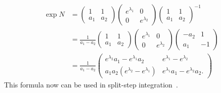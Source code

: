 \begin{equation}
\begin{split}
	\exp \hat{N} & = \begin{pmatrix}
		1 & 1 \\ a_1 & a_2
	\end{pmatrix}
	\begin{pmatrix}
		e^{\lambda_1} & 0 \\ 0 & e^{\lambda_2}
	\end{pmatrix}
	\begin{pmatrix}
		1 & 1 \\ a_1 & a_2
	\end{pmatrix}^{-1} \\
	& = \frac{1}{a_1 - a_2}
	\begin{pmatrix}
		1 & 1 \\ a_1 & a_2
	\end{pmatrix}
	\begin{pmatrix}
		e^{\lambda_1} & 0 \\ 0 & e^{\lambda_2}
	\end{pmatrix}
	\begin{pmatrix}
		-a_2 & 1 \\ a_1 & -1
	\end{pmatrix} \\
	& = \frac{1}{a_1 - a_2}
	\begin{pmatrix}
		e^{\lambda_2} a_1 - e^{\lambda_1} a_2 &
		e^{\lambda_1} - e^{\lambda_2} \\
		a_1 a_2 (e^{\lambda_2} - e^{\lambda_1}) &
		e^{\lambda_1} a_1 - e^{\lambda_2} a_2.
	\end{pmatrix}
\end{split}
\end{equation}
This formula now can be used in split-step integration~.
